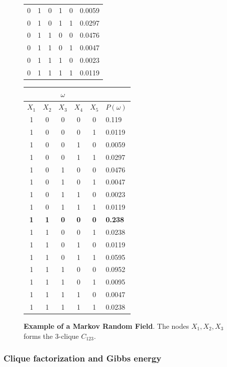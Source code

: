\begin{figure}
\begin{minipage}{0.35\textwidth}
\begin{tabular}{|c|c|c|c|c|l|}
0 & 1 & 0 & 1 & 0 & 0.0059 \\
0 & 1 & 0 & 1 & 1 & 0.0297 \\
0 & 1 & 1 & 0 & 0 & 0.0476 \\
0 & 1 & 1 & 0 & 1 & 0.0047 \\
0 & 1 & 1 & 1 & 0 & 0.0023 \\
0 & 1 & 1 & 1 & 1 & 0.0119 \\
\hline
\end{tabular}
\end{minipage}%
\begin{minipage}{0.35\textwidth}
\tiny
\begin{tabular}{|c|c|c|c|c|l|}
\hline
\multicolumn{5}{|c|}{$\omega$} &\\
\hline
$X_1$ & $X_2$ & $X_3$ & $X_4$ & $X_5$ & $P(\omega)$\\
\hline
1 & 0 & 0 & 0 & 0 & 0.119 \\
1 & 0 & 0 & 0 & 1 & 0.0119 \\
1 & 0 & 0 & 1 & 0 & 0.0059 \\
1 & 0 & 0 & 1 & 1 & 0.0297 \\
1 & 0 & 1 & 0 & 0 & 0.0476 \\
1 & 0 & 1 & 0 & 1 & 0.0047 \\
1 & 0 & 1 & 1 & 0 & 0.0023 \\
1 & 0 & 1 & 1 & 1 & 0.0119 \\
\textbf{1} & \textbf{1} & \textbf{0} & \textbf{0} & \textbf{0} & \textbf{0.238} \\
1 & 1 & 0 & 0 & 1 & 0.0238 \\
1 & 1 & 0 & 1 & 0 & 0.0119 \\
1 & 1 & 0 & 1 & 1 & 0.0595 \\
1 & 1 & 1 & 0 & 0 & 0.0952 \\
1 & 1 & 1 & 0 & 1 & 0.0095 \\
1 & 1 & 1 & 1 & 0 & 0.0047 \\
1 & 1 & 1 & 1 & 1 & 0.0238 \\
\hline
\end{tabular}
\end{minipage}
\caption{\textbf{Example of a Markov Random Field}. The nodes $X_1, X_2, X_3$ forms the $3$-clique $C_{123}$.}
\label{ch2:fig:example-mrf}
\end{figure}

\subsubsection{Clique factorization and Gibbs energy}


